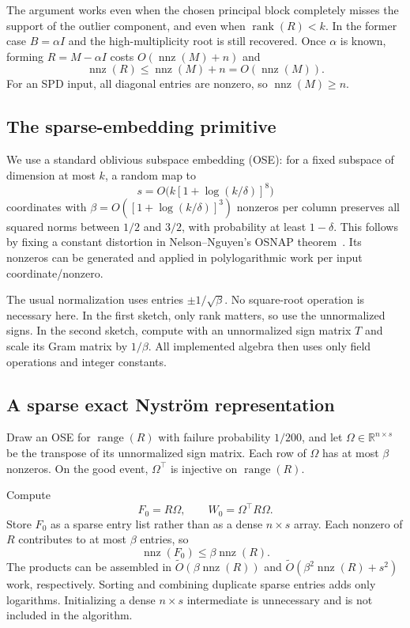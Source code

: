 \documentclass[11pt,a4paper]{article}
\newcommand{\R}{\mathbb R}
\newcommand{\nnz}{\operatorname{nnz}}
\newcommand{\rank}{\operatorname{rank}}
\newcommand{\range}{\operatorname{range}}
\newcommand{\softO}{\widetilde O}
\theoremstyle{definition}
\theoremstyle{remark}
\begin{document}
The argument works even when the chosen principal block completely misses the support of the outlier component, and even when $\rank(R)<k$. In the former case $B=\alpha I$ and the high-multiplicity root is still recovered. Once $\alpha$ is known, forming $R=M-\alpha I$ costs $O(\nnz(M)+n)$ and
\[
 \nnz(R)\le\nnz(M)+n=O(\nnz(M)).
\]
For an SPD input, all diagonal entries are nonzero, so $\nnz(M)\ge n$.

\subsection{The sparse-embedding primitive}
We use a standard oblivious subspace embedding (OSE): for a fixed subspace of dimension at most $k$, a random map to
\[
 s=O\bigl(k[1+\log(k/\delta)]^8\bigr)
\]
coordinates with
$\beta=O([1+\log(k/\delta)]^3)$ nonzeros per column preserves all squared norms between $1/2$ and $3/2$, with probability at least $1-\delta$. This follows by fixing a constant distortion in Nelson--Nguyen's OSNAP theorem~\cite[Theorem 9]{osnap}. Its nonzeros can be generated and applied in polylogarithmic work per input coordinate/nonzero.

The usual normalization uses entries $\pm1/\sqrt\beta$. No square-root operation is necessary here. In the first sketch, only rank matters, so use the unnormalized signs. In the second sketch, compute with an unnormalized sign matrix $T$ and scale its Gram matrix by $1/\beta$. All implemented algebra then uses only field operations and integer constants.

\subsection{A sparse exact Nystr\"om representation}
Draw an OSE for $\range(R)$ with failure probability $1/200$, and let $\Omega\in\R^{n\times s}$ be the transpose of its unnormalized sign matrix. Each row of $\Omega$ has at most $\beta$ nonzeros. On the good event, $\Omega^\top$ is injective on $\range(R)$.

Compute
\begin{equation}
 F_0=R\Omega,\qquad W_0=\Omega^\top R\Omega. \label{eq:first-sketch}
\end{equation}
Store $F_0$ as a sparse entry list rather than as a dense $n\times s$ array. Each nonzero of $R$ contributes to at most $\beta$ entries, so
\begin{equation}
 \nnz(F_0)\le\beta\nnz(R). \label{eq:F-sparse}
\end{equation}
The products can be assembled in $\softO(\beta\nnz(R))$ and
$\softO(\beta^2\nnz(R)+s^2)$ work, respectively. Sorting and combining duplicate sparse entries adds only logarithms. Initializing a dense $n\times s$ intermediate is unnecessary and is not included in the algorithm.
\end{document}
